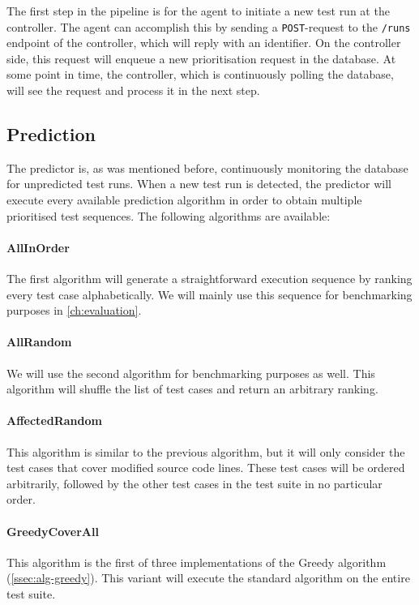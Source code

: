 \noindent The first step in the pipeline is for the agent to initiate a new test run at the controller. The agent can accomplish this by sending a \texttt{POST}-request to the \texttt{/runs} endpoint of the controller, which will reply with an identifier. On the controller side, this request will enqueue a new prioritisation request in the database. At some point in time, the controller, which is continuously polling the database, will see the request and process it in the next step.

\subsection{Prediction}
The predictor is, as was mentioned before, continuously monitoring the database for unpredicted test runs. When a new test run is detected, the predictor will execute every available prediction algorithm in order to obtain multiple prioritised test sequences. The following algorithms are available:

\paragraph*{AllInOrder} The first algorithm will generate a straightforward execution sequence by ranking every test case alphabetically. We will mainly use this sequence for benchmarking purposes in \cref{ch:evaluation}.

\paragraph*{AllRandom} We will use the second algorithm for benchmarking purposes as well. This algorithm will shuffle the list of test cases and return an arbitrary ranking.

\paragraph*{AffectedRandom} This algorithm is similar to the previous algorithm, but it will only consider the test cases that cover modified source code lines. These test cases will be ordered arbitrarily, followed by the other test cases in the test suite in no particular order.

\paragraph*{GreedyCoverAll} This algorithm is the first of three implementations of the Greedy algorithm (\cref{ssec:alg-greedy}). This variant will execute the standard algorithm on the entire test suite.

